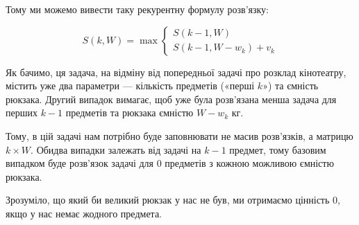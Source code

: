 \documentclass[12pt,a4paper]{report}
\begin{document}
Тому ми можемо вивести таку рекурентну формулу розв’язку:

\begin{equation*}
    S(k, W) = \max
    \begin{cases}
        S(k - 1, W) \\
        S(k - 1, W - w_k) + v_k
    \end{cases}
\end{equation*}

Як бачимо, ця задача, на відміну від попередньої задачі про розклад кінотеатру, містить уже два параметри --- кількість предметів («перші \(k\)») та ємність рюкзака. Другий випадок вимагає, щоб уже була розв’язана менша задача для перших \(k - 1\) предметів та рюкзака ємністю \(W - w_k\) кг.

Тому, в цій задачі нам потрібно буде заповнювати не масив розв’язків, а матрицю \(k \times W\). Обидва випадки залежать від задачі на \(k - 1\) предмет, тому базовим випадком буде розв’язок задачі для 0 предметів з кожною можливою ємністю рюкзака.

Зрозуміло, що який би великий рюкзак у нас не був, ми отримаємо цінність 0, якщо у нас немає жодного предмета.
\end{document}
